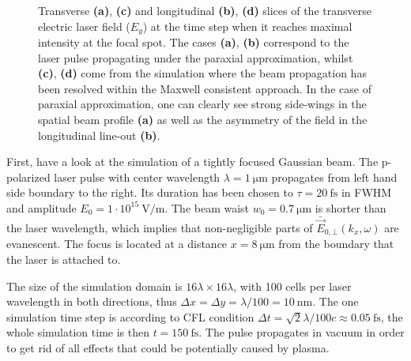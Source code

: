 \begin{figure}[h!]
	\hspace{2mm}
	\caption{Transverse \textbf{(a)}, \textbf{(c)} and longitudinal \textbf{(b)}, \textbf{(d)} slices of the transverse electric laser field ($ E_{y} $) at the time step when it reaches maximal intensity at the focal spot. The cases \textbf{(a)}, \textbf{(b)} correspond to the laser pulse propagating under the paraxial approximation, whilst \textbf{(c)}, \textbf{(d)} come from the simulation where the beam propagation has been resolved within the Maxwell consistent approach. In the case of paraxial approximation, one can clearly see strong side-wings in the spatial beam profile \textbf{(a)} as well as the asymmetry of the field in the longitudinal line-out \textbf{(b)}.}
	\label{fig:2}
\end{figure}

First, have a look at the simulation of a tightly focused Gaussian beam. The p-polarized laser pulse with center wavelength $ \lambda = 1 \: \mathrm{\mu m} $ propagates from left hand side boundary to the right. Its duration has been chosen to $ \tau = 20 \: \mathrm{fs} $ in FWHM and amplitude $ E_0 = 1 \cdot 10^{15} \: \mathrm{V/m} $. The beam waist $ w_0 = 0.7 \: \mathrm{\mu m} $ is shorter than the laser wavelength, which implies that non-negligible parts of $ \bar{\vec{E}}_{0, \bot}(k_x, \omega) $ are evanescent. The focus is located at a distance $ x = 8 \: \mathrm{\mu m} $ from the boundary that the laser is attached to.

The size of the simulation domain is $ 16 \lambda \times 16 \lambda $, with 100 cells per laser wavelength in both directions, thus $ \Delta x = \Delta y = \lambda/100 = 10 \: \mathrm{nm} $. The one simulation time step is according to CFL condition $ \Delta t = \sqrt{2} \lambda/ 100 c \approx 0.05 \: \mathrm{fs} $, the whole simulation time is then $ t = 150 \: \mathrm{fs} $. The pulse propagates in vacuum in order to get rid of all effects that could be potentially caused by plasma.

